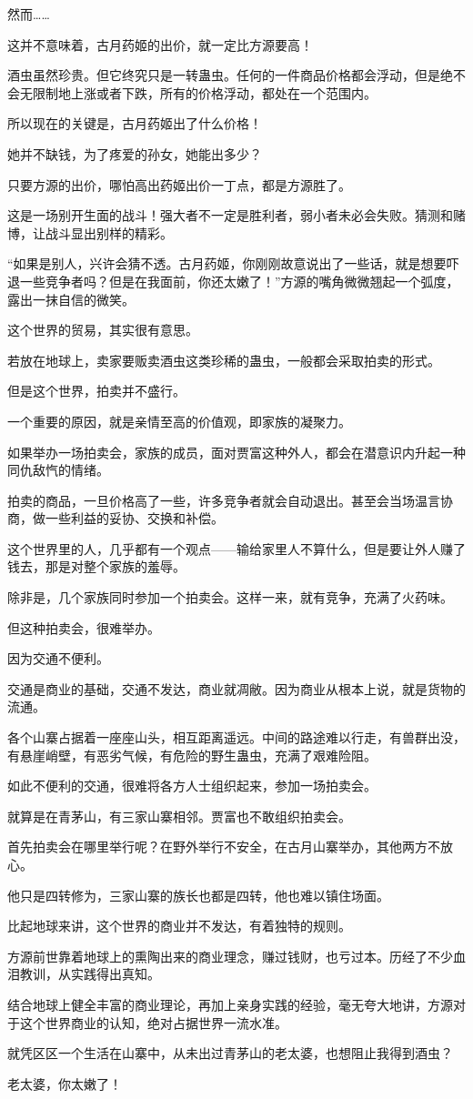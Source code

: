 \begin{this_body}
然而……

这并不意味着，古月药姬的出价，就一定比方源要高！

酒虫虽然珍贵。但它终究只是一转蛊虫。任何的一件商品价格都会浮动，但是绝不会无限制地上涨或者下跌，所有的价格浮动，都处在一个范围内。

所以现在的关键是，古月药姬出了什么价格！

她并不缺钱，为了疼爱的孙女，她能出多少？

只要方源的出价，哪怕高出药姬出价一丁点，都是方源胜了。

这是一场别开生面的战斗！强大者不一定是胜利者，弱小者未必会失败。猜测和赌博，让战斗显出别样的精彩。

“如果是别人，兴许会猜不透。古月药姬，你刚刚故意说出了一些话，就是想要吓退一些竞争者吗？但是在我面前，你还太嫩了！”方源的嘴角微微翘起一个弧度，露出一抹自信的微笑。

这个世界的贸易，其实很有意思。

若放在地球上，卖家要贩卖酒虫这类珍稀的蛊虫，一般都会采取拍卖的形式。

但是这个世界，拍卖并不盛行。

一个重要的原因，就是亲情至高的价值观，即家族的凝聚力。

如果举办一场拍卖会，家族的成员，面对贾富这种外人，都会在潜意识内升起一种同仇敌忾的情绪。

拍卖的商品，一旦价格高了一些，许多竞争者就会自动退出。甚至会当场温言协商，做一些利益的妥协、交换和补偿。

这个世界里的人，几乎都有一个观点——输给家里人不算什么，但是要让外人赚了钱去，那是对整个家族的羞辱。

除非是，几个家族同时参加一个拍卖会。这样一来，就有竞争，充满了火药味。

但这种拍卖会，很难举办。

因为交通不便利。

交通是商业的基础，交通不发达，商业就凋敝。因为商业从根本上说，就是货物的流通。

各个山寨占据着一座座山头，相互距离遥远。中间的路途难以行走，有兽群出没，有悬崖峭壁，有恶劣气候，有危险的野生蛊虫，充满了艰难险阻。

如此不便利的交通，很难将各方人士组织起来，参加一场拍卖会。

就算是在青茅山，有三家山寨相邻。贾富也不敢组织拍卖会。

首先拍卖会在哪里举行呢？在野外举行不安全，在古月山寨举办，其他两方不放心。

他只是四转修为，三家山寨的族长也都是四转，他也难以镇住场面。

比起地球来讲，这个世界的商业并不发达，有着独特的规则。

方源前世靠着地球上的熏陶出来的商业理念，赚过钱财，也亏过本。历经了不少血泪教训，从实践得出真知。

结合地球上健全丰富的商业理论，再加上亲身实践的经验，毫无夸大地讲，方源对于这个世界商业的认知，绝对占据世界一流水准。

就凭区区一个生活在山寨中，从未出过青茅山的老太婆，也想阻止我得到酒虫？

老太婆，你太嫩了！

\end{this_body}

